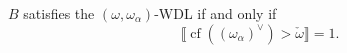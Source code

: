 $B$ satisfies the $(\omega, \omega_{\alpha})$-WDL if and only if
$$
\llbracket \operatorname{cf}((\omega_{\alpha})^{\vee}) > \check{\omega} \rrbracket = 1.
$$
